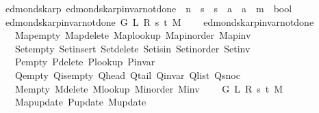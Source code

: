 \begin{isabellebody}
%
\isadeliminvisible
\isanewline
%
\endisadeliminvisible
%
\isataginvisible
{}\isamarkupfalse%
\ {\isacharparenleft}{\kern0pt}\ edmonds{\isacharunderscore}{\kern0pt}karp{\isacharparenright}{\kern0pt}\ edmonds{\isacharunderscore}{\kern0pt}karp{\isacharunderscore}{\kern0pt}invar{\isacharunderscore}{\kern0pt}not{\isacharunderscore}{\kern0pt}done{\isacharunderscore}{\kern0pt}{}{\isacharprime}{\kern0pt}\ {\isacharcolon}{\kern0pt}{\isacharcolon}{\kern0pt}\ {\isachardoublequoteopen}{\isacharprime}{\kern0pt}n\ {\isasymRightarrow}\ {\isacharprime}{\kern0pt}s\ {\isasymRightarrow}\ {\isacharprime}{\kern0pt}s\ {\isasymRightarrow}\ {\isacharprime}{\kern0pt}a\ {\isasymRightarrow}\ {\isacharprime}{\kern0pt}a\ {\isasymRightarrow}\ {\isacharprime}{\kern0pt}m\ {\isasymRightarrow}\ bool{\isachardoublequoteclose}\ \isanewline
\ \ {\isachardoublequoteopen}edmonds{\isacharunderscore}{\kern0pt}karp{\isacharunderscore}{\kern0pt}invar{\isacharunderscore}{\kern0pt}not{\isacharunderscore}{\kern0pt}done{\isacharunderscore}{\kern0pt}{}{\isacharprime}{\kern0pt}\ G\ L\ R\ s\ t\ M\ {\isasymequiv}\isanewline
\ \ \ edmonds{\isacharunderscore}{\kern0pt}karp{\isacharunderscore}{\kern0pt}invar{\isacharunderscore}{\kern0pt}not{\isacharunderscore}{\kern0pt}done{\isacharunderscore}{\kern0pt}{}\isanewline
\ \ \ \ Map{\isacharunderscore}{\kern0pt}empty\ Map{\isacharunderscore}{\kern0pt}delete\ Map{\isacharunderscore}{\kern0pt}lookup\ Map{\isacharunderscore}{\kern0pt}inorder\ Map{\isacharunderscore}{\kern0pt}inv\isanewline
\ \ \ \ Set{\isacharunderscore}{\kern0pt}empty\ Set{\isacharunderscore}{\kern0pt}insert\ Set{\isacharunderscore}{\kern0pt}delete\ Set{\isacharunderscore}{\kern0pt}isin\ Set{\isacharunderscore}{\kern0pt}inorder\ Set{\isacharunderscore}{\kern0pt}inv\isanewline
\ \ \ \ P{\isacharunderscore}{\kern0pt}empty\ P{\isacharunderscore}{\kern0pt}delete\ P{\isacharunderscore}{\kern0pt}lookup\ P{\isacharunderscore}{\kern0pt}invar\isanewline
\ \ \ \ Q{\isacharunderscore}{\kern0pt}empty\ Q{\isacharunderscore}{\kern0pt}is{\isacharunderscore}{\kern0pt}empty\ Q{\isacharunderscore}{\kern0pt}head\ Q{\isacharunderscore}{\kern0pt}tail\ Q{\isacharunderscore}{\kern0pt}invar\ Q{\isacharunderscore}{\kern0pt}list\ Q{\isacharunderscore}{\kern0pt}snoc\isanewline
\ \ \ \ M{\isacharunderscore}{\kern0pt}empty\ M{\isacharunderscore}{\kern0pt}delete\ M{\isacharunderscore}{\kern0pt}lookup\ M{\isacharunderscore}{\kern0pt}inorder\ M{\isacharunderscore}{\kern0pt}inv\isanewline
\ \ \ \ G\ L\ R\ s\ t\ M\isanewline
\ \ \ \ Map{\isacharunderscore}{\kern0pt}update\ P{\isacharunderscore}{\kern0pt}update\ M{\isacharunderscore}{\kern0pt}update{\isachardoublequoteclose}\isanewline

\end{isabellebody}
